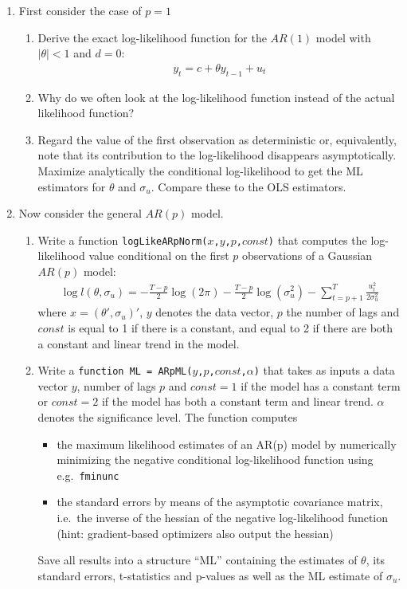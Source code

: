 \begin{enumerate}
\item
First consider the case of \(p=1\)
\begin{enumerate}
  \item Derive the exact log-likelihood function for the \(AR(1)\) model with \(|\theta|<1\) and \(d=0\):
  \begin{align*}
  y_t = c + \theta y_{t-1} + u_t
  \end{align*}
  \item Why do we often look at the log-likelihood function instead of the actual likelihood function?
  \item Regard the value of the first observation as deterministic or, equivalently,
    note that its contribution to the log-likelihood disappears asymptotically.
    Maximize analytically the conditional log-likelihood to get the ML estimators for \(\theta \) and \(\sigma_u\).
    Compare these to the OLS estimators.
\end{enumerate}
\item
Now consider the general \(AR(p)\) model.
\begin{enumerate}
  \item Write a function \texttt{logLikeARpNorm{(\(x\),\(y\),\(p\),\(const\))}}
    that computes the log-likelihood value
    conditional on the first \(p\) observations of a Gaussian \(AR(p)\) model:
  \begin{align*}
  \log l(\theta,\sigma_u)= -\frac{T-p}{2}\log(2\pi)-\frac{T-p}{2}\log(\sigma_u^2)-\sum_{t=p+1}^{T}\frac{u_t^2}{2\sigma_u^2}
  \end{align*}
  where \(x=(\theta',\sigma_u)'\), \(y\) denotes the data vector,
  \(p\) the number of lags and \(const\) is equal to 1 if there is a constant,
  and equal to 2 if there are both a constant and linear trend in the model.
  \item Write a \texttt{function ML = ARpML{(\(y\),\(p\),\(const\),\( \alpha \))}}
    that takes as inputs a data vector \(y\), number of lags \(p\)
    and \(const=1\) if the model has a constant term
    or \(const=2\) if the model has both a constant term and linear trend.
  \(\alpha \) denotes the significance level.
  The function computes 
  \begin{itemize}
    \item the maximum likelihood estimates of an AR{(p)} model
      by numerically minimizing the negative conditional log-likelihood function using e.g.\ \texttt{fminunc}
    \item the standard errors by means of the asymptotic covariance matrix, i.e.\
      the inverse of the hessian of the negative log-likelihood function
      (hint: gradient-based optimizers also output the hessian)
  \end{itemize}
  Save all results into a structure \enquote{ML} containing the estimates of \(\theta \),
    its standard errors, t-statistics and p-values as well as the ML estimate of \(\sigma_u\).
    

\end{enumerate}
\end{enumerate}
